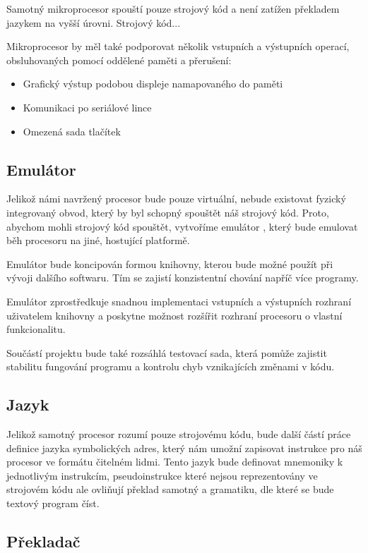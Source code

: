Samotný mikroprocesor spouští pouze strojový kód a není zatížen překladem jazykem na vyšší úrovni. Strojový kód...

Mikroprocesor by měl také podporovat několik vstupních a výstupních operací, obsluhovaných pomocí oddělené paměti a přerušení:

\begin{itemize}
	\item Grafický výstup podobou displeje namapovaného do paměti
	\item Komunikaci po seriálové lince
	\item Omezená sada tlačítek
\end{itemize}

\subsection{Emulátor}

Jelikož námi navržený procesor bude pouze virtuální, nebude existovat fyzický integrovaný obvod, který by byl schopný spouštět náš strojový kód. Proto, abychom mohli strojový kód spouštět, vytvoříme emulátor , který bude emulovat běh procesoru na jiné, hostující platformě.

Emulátor bude koncipován formou knihovny, kterou bude možné použít při vývoji dalšího softwaru. Tím se zajistí konzistentní chování napříč více programy.

Emulátor zprostředkuje snadnou implementaci vstupních a výstupních rozhraní uživatelem knihovny a poskytne možnost rozšířit rozhraní procesoru o vlastní funkcionalitu.

Součástí projektu bude také rozsáhlá testovací sada, která pomůže zajistit stabilitu fungování programu a kontrolu chyb vznikajících změnami v kódu. 

\subsection{Jazyk}

Jelikož samotný procesor rozumí pouze strojovému kódu, bude další částí práce definice jazyka symbolických adres, který nám umožní zapisovat instrukce pro náš procesor ve formátu čitelném lidmi. Tento jazyk bude definovat mnemoniky k jednotlivým instrukcím, pseudoinstrukce které nejsou reprezentovány ve strojovém kódu ale ovliňují překlad samotný a gramatiku, dle které se bude textový program číst.

\subsection{Překladač}

